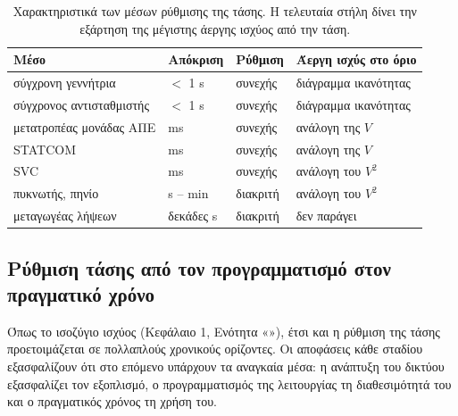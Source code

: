 \begin{table}[!htbp]
\centering
\begin{tabular}{llll}
\hline
Μέσο & Απόκριση & Ρύθμιση & Άεργη ισχύς στο όριο \\
\hline
σύγχρονη γεννήτρια & $<$ 1 s & συνεχής & διάγραμμα ικανότητας \\
σύγχρονος αντισταθμιστής & $<$ 1 s & συνεχής & διάγραμμα ικανότητας \\
μετατροπέας μονάδας ΑΠΕ & ms & συνεχής & ανάλογη της $V$ \\
STATCOM & ms & συνεχής & ανάλογη της $V$ \\
SVC & ms & συνεχής & ανάλογη του $V^2$ \\
πυκνωτής, πηνίο & s -- min & διακριτή & ανάλογη του $V^2$ \\
μεταγωγέας λήψεων & δεκάδες s & διακριτή & δεν παράγει \\
\hline
\end{tabular}
\caption{Χαρακτηριστικά των μέσων ρύθμισης της τάσης. Η τελευταία στήλη δίνει την εξάρτηση της
μέγιστης άεργης ισχύος από την τάση.}
\label{tab:v-means}
\end{table}

\subsection{Ρύθμιση τάσης από τον προγραμματισμό στον πραγματικό χρόνο}
\label{sec:v-stages}

Όπως το ισοζύγιο ισχύος (Κεφάλαιο 1, Ενότητα «»), έτσι και η ρύθμιση της
τάσης προετοιμάζεται σε πολλαπλούς χρονικούς ορίζοντες. Οι αποφάσεις κάθε σταδίου εξασφαλίζουν
ότι στο επόμενο υπάρχουν τα αναγκαία μέσα: η ανάπτυξη του δικτύου εξασφαλίζει τον εξοπλισμό, ο
προγραμματισμός της λειτουργίας τη διαθεσιμότητά του και ο πραγματικός χρόνος τη χρήση του.

